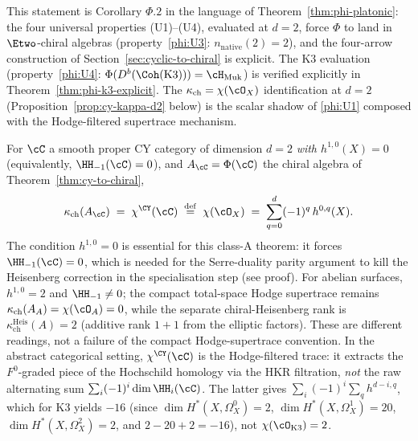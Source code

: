 \begin{remark}[Theorem~\textup{\ref{thm:cy-to-chiral}} is the \texorpdfstring{$d = 2$}{d = 2} evaluation of \texorpdfstring{$\Phi$}{Phi}]
\label{rem:cy-a-d2-as-evaluation}
This statement is Corollary $\Phi.2$ in the language of Theorem~\textup{\ref{thm:phi-platonic}}: the four universal properties \textup{(U1)--(U4)}, evaluated at $d = 2$, force $\Phi$ to land in $\Etwo$-chiral algebras \textup{(}property~\textup{\ref{phi:U3}}: $n_{\mathrm{native}}(2) = 2$\textup{),} and the four-arrow construction of Section~\textup{\ref{sec:cyclic-to-chiral}} is explicit. The K3 evaluation \textup{(}property~\textup{\ref{phi:U4}}: $\Phi(D^b(\Coh(\mathrm{K3}))) = \cH_{\mathrm{Muk}}$\textup{)} is verified explicitly in Theorem~\textup{\ref{thm:phi-k3-explicit}}. The $\kappa_{\mathrm{ch}} = \chi(\cO_X)$ identification at $d = 2$ \textup{(}Proposition~\textup{\ref{prop:cy-kappa-d2}} below\textup{)} is the scalar shadow of \textup{\ref{phi:U1}} composed with the Hodge-filtered supertrace mechanism.
\end{remark}

\begin{proposition}[CY modular characteristic at \texorpdfstring{$d = 2$}{d = 2}: Theorem CY-A\texorpdfstring{$_2$}{-2}(iii)]
\label{prop:cy-kappa-d2}
For $\cC$ a smooth proper CY category of dimension $d = 2$ \emph{with $h^{1,0}(X) = 0$} (equivalently, $\HH_{-1}(\cC) = 0$), and $A_\cC = \Phi(\cC)$ the chiral algebra of Theorem~\textup{\ref{thm:cy-to-chiral}},
\[
 \kappa_{\mathrm{ch}}(A_\cC) \;=\; \chi^{\CY}(\cC) \;\stackrel{\mathrm{def}}{=}\; \chi(\cO_X) \;=\; \sum_{q=0}^{d} (-1)^q\, h^{0,q}(X).
\]
The condition $h^{1,0} = 0$ is essential for this class-A theorem: it forces $\HH_{-1}(\cC) = 0$, which is needed for the Serre-duality parity argument to kill the Heisenberg correction in the specialisation step (see proof). For abelian surfaces, $h^{1,0} = 2$ and $\HH_{-1} \neq 0$; the compact total-space Hodge supertrace remains $\kappa_{\mathrm{ch}}(A_A)=\chi(\cO_A)=0$, while the separate chiral-Heisenberg rank is $\kappa_{\mathrm{ch}}^{\mathrm{Heis}}(A)=2$ (additive rank $1+1$ from the elliptic factors). These are different readings, not a failure of the compact Hodge-supertrace convention. In the abstract categorical setting, $\chi^{\CY}(\cC)$ is the Hodge-filtered trace: it extracts the $F^0$-graded piece of the Hochschild homology via the HKR filtration, \emph{not} the raw alternating sum $\sum_i (-1)^i \dim \HH_i(\cC)$. The latter gives $\sum_i (-1)^i \sum_q h^{d-i,q}$, which for K3 yields $-16$ (since $\dim H^*(X, \Omega^0_X) = 2$, $\dim H^*(X, \Omega^1_X) = 20$, $\dim H^*(X, \Omega^2_X) = 2$, and $2 - 20 + 2 = -16$), not $\chi(\cO_{\mathrm{K3}}) = 2$.
\end{proposition}

